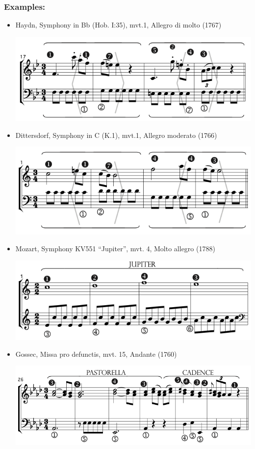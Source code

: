 ﻿\documentclass[11pt, openany]{article}
\begin{document}
\begin{itemize}
\subsubsection{Examples:}
\begin{itemize}
\item Haydn, Symphony in Bb (Hob. I:35), mvt.1, Allegro di molto (1767)
\begin{center}
\includegraphics[scale=0.5]{haydn35.png}
\end{center}
\item Dittersdorf, Symphony in C (K.1), mvt.1, Allegro moderato (1766)
\begin{center}
\includegraphics[scale=0.5]{dittersdorf1.png}
\end{center}
\item Mozart, Symphony KV551 “Jupiter”, mvt. 4, Molto allegro (1788)
\begin{center}
\includegraphics[scale=0.5]{mozart551.png}
\end{center}
\item Gossec, Missa pro defunctis, mvt. 15, Andante (1760)
\begin{center}
\includegraphics[scale=0.5]{gossecmpd.png}
\end{center}
\end{itemize}



\end{itemize}
\end{document}
